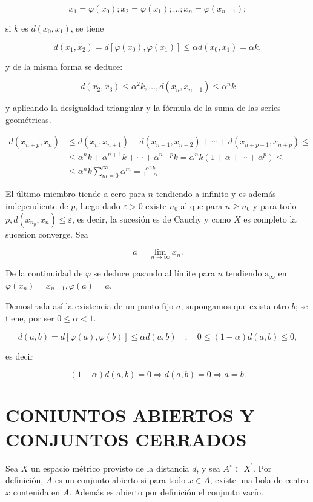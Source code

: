 \documentclass[10pt]{article}
\theoremstyle{plain}
\theoremstyle{definition}
\theoremstyle{remark}
\begin{document}
$$
x_{1}=\varphi\left(x_{0}\right) ; x_{2}=\varphi\left(x_{1}\right) ; \ldots ; x_{n}=\varphi\left(x_{n-1}\right) ;
$$

si $k$ es $d\left(x_{0}, x_{1}\right)$, se tiene

$$
d\left(x_{1}, x_{2}\right)=d\left[\varphi\left(x_{0}\right), \varphi\left(x_{1}\right)\right] \leqslant \alpha d\left(x_{0}, x_{1}\right)=\alpha k,
$$

y de la misma forma se deduce:

$$
d\left(x_{2}, x_{3}\right) \leqslant \alpha^{2} k, \ldots, d\left(x_{n}, x_{n+1}\right) \leqslant \alpha^{n} k
$$

y aplicando la desigualdad triangular y la fórmula de la suma de las series gcométricas.

$$
\begin{aligned}
d\left(x_{n+p}, x_{n}\right) & \leqslant d\left(x_{n}, x_{n+1}\right)+d\left(x_{n+1}, x_{n+2}\right)+\cdots+d\left(x_{n+p-1}, x_{n+p}\right) \leqslant \\
& \leqslant \alpha^{n} k+\alpha^{n+1} k+\cdots+\alpha^{n+p} k=\alpha^{n} k\left(1+\alpha+\cdots+\alpha^{p}\right) \leqslant \\
& \leqslant \alpha^{n} k \sum_{m=0}^{\infty} \alpha^{m}=\frac{\alpha^{n} k}{1-\alpha}
\end{aligned}
$$

El último miembro tiende a cero para $n$ tendiendo a infinito y es además independiente de $p$, luego dado $\varepsilon>0$ existe $n_{0}$ al que para $n \geqslant n_{0}$ y para todo $p, d\left(x_{n_{p}}, x_{n}\right) \leqslant \varepsilon$, es decir, la sucesión es de Cauchy y como $X$ es completo la sucesion converge. Sea

$$
a=\lim _{n \rightarrow \infty} x_{n} .
$$

De la continuidad de $\varphi$ se deduce pasando al límite para $n$ tendiendo $\mathrm{a}_{\infty}$ en $\varphi\left(x_{n}\right)=x_{n+1}, \varphi(a)=a$.

Demostrada así la existencia de un punto fijo $a$, supongamos que exista otro $b$; se tiene, por ser $0 \leqslant \alpha<1$.

$$
d(a, b)=d[\varphi(a), \varphi(b)] \leqslant \alpha d(a, b) \quad ; \quad 0 \leqslant(1-\alpha) d(a, b) \leqslant 0,
$$

es decir

$$
(1-\alpha) d(a, b)=0 \Rightarrow d(a, b)=0 \Rightarrow a=b .
$$

\section*{CONIUNTOS ABIERTOS Y CONJUNTOS CERRADOS}
Sea $X$ un espacio métrico provisto de la distancia $d$, y sea $A^{\circ} \subset X^{\prime}$. Por definición, $A$ es un conjunto abierto si para todo $x \in A$, existe una bola de centro $x$ contenida en $A$. Además es abierto por definición el conjunto vacío.
\end{document}
